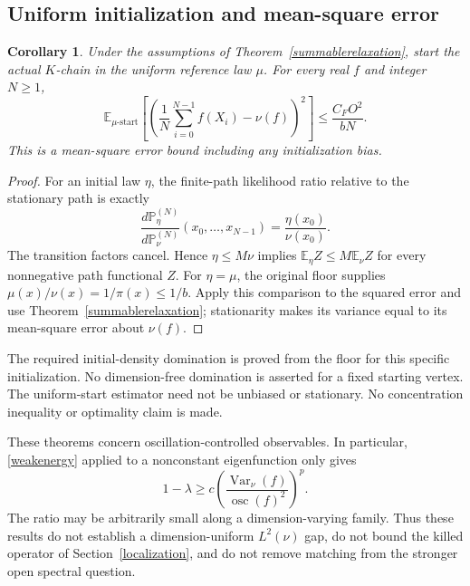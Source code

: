 \documentclass[11pt]{article}
\newtheorem{corollary}[theorem]{Corollary}
\begin{document}
\subsection{Uniform initialization and mean-square error}
\begin{corollary}\label{uniformstart}
Under the assumptions of Theorem~\ref{summablerelaxation}, start the
actual $K$-chain in the uniform reference law $\mu$. For every real $f$
and integer $N\geq1$,
\[
 \mathbb E_{\mu\text{-start}}
 \left[\left(\frac1N\sum_{i=0}^{N-1}f(X_i)-\nu(f)\right)^2\right]
 \leq \frac{C_F O^2}{bN}.
\]
This is a mean-square error bound including any initialization bias.
\end{corollary}
\begin{proof}
For an initial law $\eta$, the finite-path likelihood ratio relative
to the stationary path is exactly
\[
 \frac{d\mathbb P_\eta^{(N)}}{d\mathbb P_\nu^{(N)}}
 (x_0,\ldots,x_{N-1})=\frac{\eta(x_0)}{\nu(x_0)}.
\]
The transition factors cancel. Hence $\eta\leq M\nu$ implies
$\mathbb E_\eta Z\leq M\mathbb E_\nu Z$ for every nonnegative path
functional $Z$. For $\eta=\mu$, the original floor supplies
$\mu(x)/\nu(x)=1/\pi(x)\leq1/b$. Apply this comparison to the squared
error and use Theorem~\ref{summablerelaxation}; stationarity makes its
variance equal to its mean-square error about $\nu(f)$.
\end{proof}
The required initial-density domination is proved from the floor for
this specific initialization. No dimension-free domination is asserted
for a fixed starting vertex. The uniform-start estimator need not be
unbiased or stationary. No concentration inequality or optimality claim
is made.

These theorems concern oscillation-controlled observables. In particular,
\eqref{weakenergy} applied to a nonconstant eigenfunction only gives
\[
 1-\lambda\geq
 c\left(\frac{\operatorname{Var}_\nu(f)}
               {\operatorname{osc}(f)^2}\right)^p.
\]
The ratio may be arbitrarily small along a dimension-varying family.
Thus these results do not establish a dimension-uniform $L^2(\nu)$ gap,
do not bound the killed operator of Section~\ref{localization}, and do
not remove matching from the stronger open spectral question.
\end{document}
